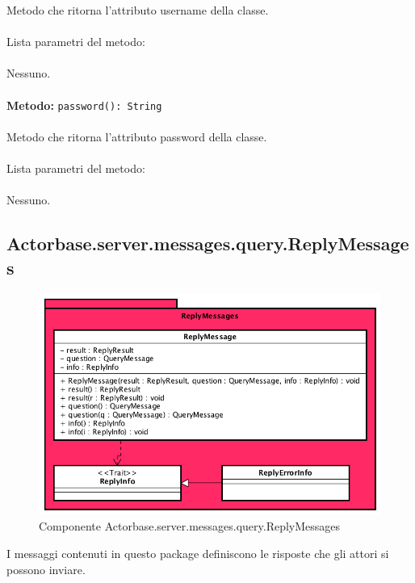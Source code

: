 \documentclass[a4paper]{article}
\begin{document}
		Metodo che ritorna l'attributo username della classe.
			\\ \\
		Lista parametri del metodo:
			\\ \\
			Nessuno.
			\\ \\		
		\textbf{Metodo: } \texttt{password(): String}
			\\ \\
		Metodo che ritorna l'attributo password della classe.
			\\ \\
		Lista parametri del metodo:
			\\ \\
			Nessuno.
	
	\subsection{Actorbase.server.messages.query.ReplyMessages}
			\begin{figure}[H]
			\centering
			\includegraphics[width=\textwidth]{Server/ReplyMessageLevel.png}
			\caption{Componente Actorbase.server.messages.query.ReplyMessages}
		\end{figure}
		I messaggi contenuti in questo package definiscono le risposte che gli attori si possono inviare.
	
\end{document}
